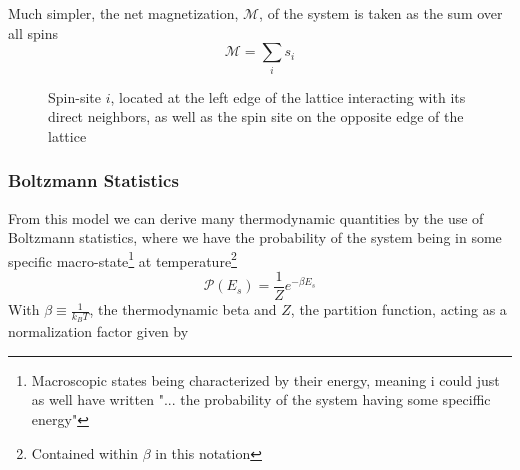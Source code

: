 \documentclass[10pt,showpacs,preprintnumbers,amsmath,amssymb,nofootinbib,aps,prl,twocolumn,groupedaddress,superscriptaddress,showkeys]{revtex4-1}
\begin{document}
    Much simpler, the net magnetization, $\mathcal M$, of the system is taken as the sum over all spins
    \begin{equation*}
      \mathcal M = \sum_i s_i
    \end{equation*}
      \begin{figure}[H]
      \centering
      \caption{Spin-site $i$, located at the left edge of the lattice interacting with its direct neighbors, as well as the spin site on the opposite edge of the lattice
      \label{fig:ising_periodic bounds}}
    \end{figure}

    \subsubsection{Boltzmann Statistics}
      From this model we can derive many thermodynamic quantities by the use of Boltzmann statistics, where we have the probability of the system being in some specific macro-state\footnote{Macroscopic states being characterized by their energy, meaning i could just as well have written "... the probability of the system having some speciffic energy"} at temperature\footnote{Contained within $\beta$ in this notation}
      \begin{equation}
        \mathcal P(E_s) = \frac{1}{Z} e^{-\beta E_s}
      \end{equation}
      With $\beta \equiv \frac{1}{k_B T}$, the thermodynamic beta and $Z$, the partition function, acting as a normalization factor given by
\end{document}
